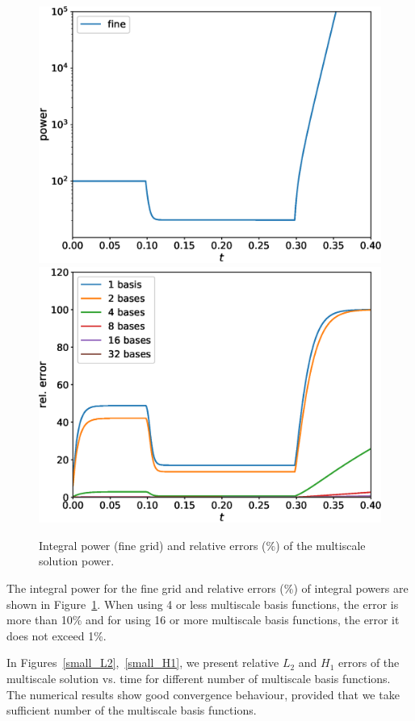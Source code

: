 \documentclass[preprint]{elsarticle}
\begin{document}
\begin{figure}[ht]
	\centering
		\includegraphics[width=0.45\linewidth]{small/power_fine.eps} \hspace{2em}
		\includegraphics[width=0.45\linewidth]{small/power_error.eps}
	\caption{Integral power (fine grid) and relative errors ($\%$) of the multiscale solution power.}
	\label{small_power}
\end{figure}
 
The integral power for the fine grid and relative errors ($\%$) of integral powers are shown in Figure~\ref{small_power}.
When using 4 or less multiscale basis functions, the error is more than 10\% and for using 16 or more multiscale basis functions, the error it does not exceed 1\%.

In Figures~\ref{small_L2},~\ref{small_H1}, we present relative $L_2$ and $H_1$ errors of the multiscale solution vs. time for different number of multiscale basis functions.
The numerical results show good convergence behaviour, provided that we take sufficient number of the multiscale basis functions.
\end{document}
